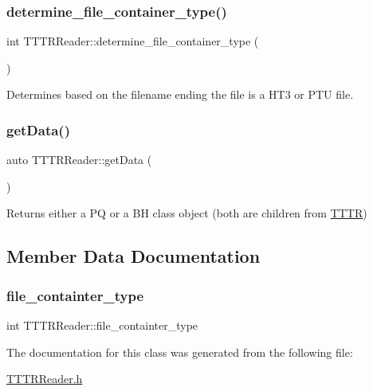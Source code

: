 \subsubsection{\texorpdfstring{determine\+\_\+file\+\_\+container\+\_\+type()}{determine\_file\_container\_type()}}
{\footnotesize\ttfamily int T\+T\+T\+R\+Reader\+::determine\+\_\+file\+\_\+container\+\_\+type (\begin{DoxyParamCaption}{ }\end{DoxyParamCaption})}



Determines based on the filename ending the file is a H\+T3 or P\+TU file. 

\mbox{\label{class_t_t_t_r_reader_ac869d47bb5af35a9000b679e20ec6517}} 
\subsubsection{\texorpdfstring{get\+Data()}{getData()}}
{\footnotesize\ttfamily auto T\+T\+T\+R\+Reader\+::get\+Data (\begin{DoxyParamCaption}{ }\end{DoxyParamCaption})}



Returns either a PQ or a BH class object (both are children from \hyperlink{class_t_t_t_r}{T\+T\+TR}) 



\subsection{Member Data Documentation}
\mbox{\label{class_t_t_t_r_reader_a9c58af8a40c6ed1608652624b5d60780}} 
\subsubsection{\texorpdfstring{file\+\_\+containter\+\_\+type}{file\_containter\_type}}
{\footnotesize\ttfamily int T\+T\+T\+R\+Reader\+::file\+\_\+containter\+\_\+type}



The documentation for this class was generated from the following file\+:\begin{DoxyCompactItemize}
\item 
\hyperlink{_t_t_t_r_reader_8h}{T\+T\+T\+R\+Reader.\+h}\end{DoxyCompactItemize}
